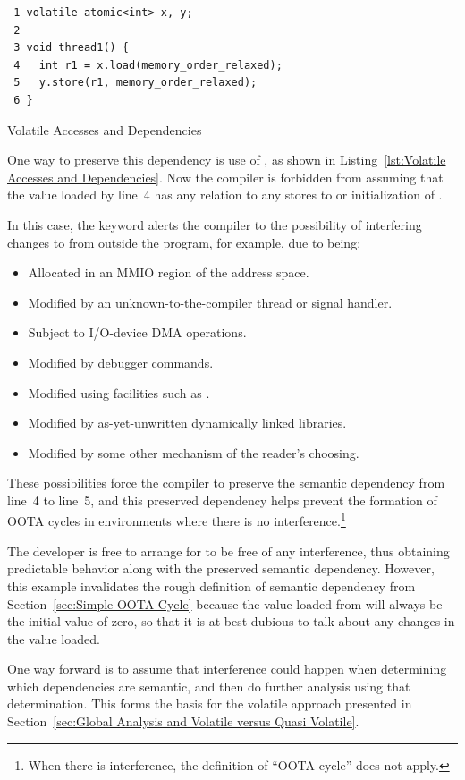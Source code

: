 \documentclass[10]{article}
\begin{document}
\begin{listing}
\begin{verbatim}
 1 volatile atomic<int> x, y;
 2
 3 void thread1() {
 4   int r1 = x.load(memory_order_relaxed);
 5   y.store(r1, memory_order_relaxed);
 6 }
\end{verbatim}
\caption{Volatile Accesses and Dependencies}
\label{lst:Volatile Accesses and Dependencies}
\end{listing}

One way to preserve this dependency is use of , as shown in
Listing~\ref{lst:Volatile Accesses and Dependencies}.
Now the compiler is forbidden from assuming that the value loaded
by line~4 has any relation to any stores to or initialization of .

In this case, the  keyword alerts the compiler to
the possibility of interfering changes to  from outside the
program, for example, due to  being:
\begin{itemize}
\item	Allocated in an MMIO region of the address space.
\item	Modified by an unknown-to-the-compiler thread
	or signal handler.
\item	Subject to I/O-device DMA operations.
\item	Modified by debugger commands.
\item	Modified using facilities such as .
\item	Modified by as-yet-unwritten dynamically linked libraries.
\item	Modified by some other mechanism of the reader's choosing.
\end{itemize}
These possibilities force the compiler to preserve the semantic
dependency from line~4 to line~5,
and this preserved dependency helps prevent the formation of OOTA cycles
in environments where there is no interference.\footnote{
	When there is interference, the definition of ``OOTA cycle''
	does not apply.}

The developer is free to arrange for  to be free of any
interference, thus obtaining predictable behavior along with the
preserved semantic dependency.
However, this example invalidates the rough definition of semantic
dependency from
Section~\ref{sec:Simple OOTA Cycle}
because the value loaded from  will always be the initial value
of zero, so that it is at best dubious to talk about any changes in
the value loaded.

One way forward is to assume that interference could happen when
determining which dependencies are semantic, and then do further analysis
using that determination.
This forms the basis for the volatile approach presented in
Section~\ref{sec:Global Analysis and Volatile versus Quasi Volatile}.
\end{document}
